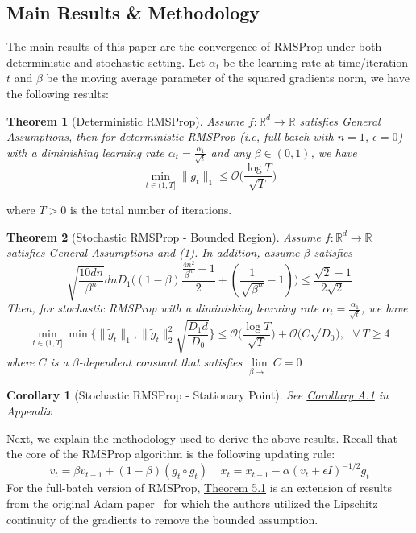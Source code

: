 \documentclass{article}
\newtheorem{theorem}{Theorem}[section]
\newtheorem{corollary}{Corollary}[section]
\begin{document}
\subsection{Main Results \& Methodology}
The main results of this paper are the convergence of RMSProp under both deterministic and stochastic setting. Let $\alpha_t$  be the learning rate at time/iteration $t$ and $\beta$ be the moving average parameter of the squared gradients norm, we have the following results: 
\begin{theorem}[Deterministic RMSProp]
	\label{theom51}
Assume $f:\mathbb{R}^d \rightarrow \mathbb{R}$ satisfies General Assumptions, then for deterministic RMSProp (i.e, full-batch with $n = 1$, $\epsilon = 0$) with a diminishing learning rate $\alpha_t = \frac{\alpha_1}{\sqrt{t}}$ and any $\beta \in (0, 1)$, we have
\[
\min_{t \in (1, T]} \|g_t\|_1 \leq \mathcal{O}\Big(\frac{\log T}{\sqrt{T}}\Big)
\]
\end{theorem}
where $T > 0$ is the total number of iterations.
\begin{theorem}[Stochastic RMSProp - Bounded Region]
	\label{theom52}
	Assume $f:\mathbb{R}^d \rightarrow \mathbb{R}$ satisfies General Assumptions and (\hyperref[eq51]{1}). In addition, assume $\beta$ satisfies
	\[
	\sqrt{\frac{10dn}{\beta^n}}dnD_1\Big((1 - \beta)\frac{\frac{4n^2}{\beta^n} - 1}{2} + (\frac{1}{\sqrt{\beta^n}}- 1)\Big)\leq \frac{\sqrt{2} - 1}{2\sqrt{2}}
	\]
	Then, for stochastic RMSProp with a diminishing learning rate $\alpha_t = \frac{\alpha_1}{\sqrt{t}}$, we have
	\[
	\min_{t \in (1, T]} \min\{\|\tilde{g}_t\|_1, \|\tilde{g}_t\|_2^2\sqrt{\frac{D_1d}{D_0}}\} \leq \mathcal{O}\Big(\frac{\log T}{\sqrt{T}}\Big) + \mathcal{O}\Big(C\sqrt{D_0}\Big), \ \ \ \forall \ T\geq 4
	\]
	where $C$ is a $\beta$-dependent constant that satisfies $\lim\limits_{\beta \rightarrow 1} C = 0$
\end{theorem}
\begin{corollary}[Stochastic RMSProp - Stationary Point]
	\label{coro51}
	See \hyperref[coro51appendix]{Corollary A.1} in Appendix
\end{corollary}
Next, we explain the methodology used to derive the above results. Recall that the core of the RMSProp algorithm is the following updating rule:
\[
v_t = \beta v_{t - 1} + (1 - \beta)(g_t \circ g_t)\ \  \ \ \ x_t = x_{t - 1} - \alpha(v_t + \epsilon I)^{-1/2}g_t
\] 
For the full-batch version of RMSProp, \hyperref[theom51]{Theorem 5.1} is an extension of results from the original Adam paper~\cite{Gower2021StochasticQM} for which the authors utilized the Lipschitz continuity of the gradients to remove the bounded assumption.\\
\end{document}
